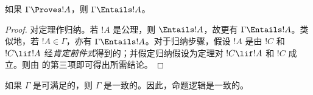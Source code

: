 \documentclass[../../../include/open-logic-section]{subfiles}
\begin{document}


\begin{thm}[可靠性]
如果 $\Gamma\Proves!A$，则 $\Gamma \Entails !A$。
\end{thm}

\begin{proof}
对定理作归纳。若 $!A$ 是公理，则 $\Entails !A$，故更有 $\Gamma \Entails!A$。类似地，若 $!A \in \Gamma$，亦有 $\Gamma \Entails!A$。对于归纳步骤，假设 $!A$ 是由 $!C$ 和 $!C\lif!A$ 经\emph{肯定前件式}得到的；并假定归纳假设为定理对 $!C\lif !A$ 和 $!C$ 成立。则由  的第三项即可得出所需结论。
\end{proof}

\begin{cor}
如果 $\Gamma$ 是可满足的，则 $\Gamma$ 是一致的。因此，命题逻辑是一致的。
\end{cor}
\end{document}
